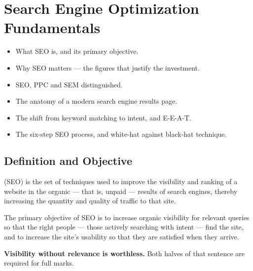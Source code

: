 
\chapter{Search Engine Optimization Fundamentals}


\begin{learningoutcomes}
\begin{itemize}
\item What SEO is, and its primary objective.
\item Why SEO matters --- the figures that justify the investment.
\item SEO, PPC and SEM distinguished.
\item The anatomy of a modern search engine results page.
\item The shift from keyword matching to intent, and E-E-A-T.
\item The six-step SEO process, and white-hat against black-hat technique.
\end{itemize}
\end{learningoutcomes}

\section{Definition and Objective}

\begin{definitionbox}
 (SEO) is the
set of techniques used to improve the visibility and ranking of a website in the
organic --- that is, unpaid --- results of search engines, thereby increasing the
quantity and quality of traffic to that site.
\end{definitionbox}

\begin{exambox}
The primary objective of SEO is to increase organic visibility for relevant
queries so that the right people --- those actively searching with intent ---
find the site, and to increase the site's usability so that they are satisfied
when they arrive.

\smallskip
\textbf{Visibility without relevance is worthless.} Both halves of that sentence
are required for full marks.
\end{exambox}

